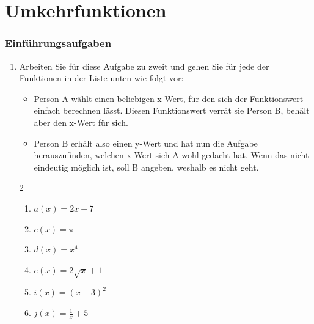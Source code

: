 
\section{Umkehrfunktionen}
\subsubsection*{Einführungsaufgaben}
\begin{enumerate}
    \item Arbeiten Sie für diese Aufgabe zu zweit und gehen Sie für jede der Funktionen in der Liste unten wie folgt vor:
          \begin{itemize}
              \item Person A wählt einen beliebigen x-Wert, für den sich der Funktionswert einfach berechnen lässt. Diesen Funktionswert verrät sie Person B, behält aber den x-Wert für sich.
              \item Person B erhält also einen y-Wert und hat nun die Aufgabe herauszufinden, welchen x-Wert sich A wohl gedacht hat. Wenn das nicht eindeutig möglich ist, soll B angeben, weshalb es nicht geht.
          \end{itemize}
          \begin{multicols}{2}
              \begin{enumerate}
                  \item $a(x) = 2x - 7$
                  \item $c(x) = \pi$
                  \item $d(x) = x^{4}$
                  \item $e(x) = 2\sqrt{x} + 1$
                  \item $i(x) = (x - 3)^{2}$
                  \item $j(x) = \frac{1}{x} + 5$

\end{enumerate}
\end{multicols}
\end{enumerate}
